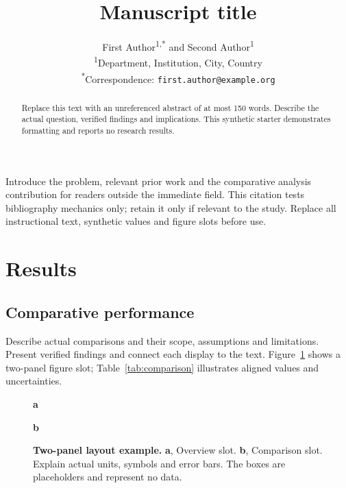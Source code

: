 \documentclass[11pt]{article}
\title{Manuscript title}
\author{First Author\textsuperscript{1,*} and Second Author\textsuperscript{1}\\
  \small \textsuperscript{1}Department, Institution, City, Country\\
  \small \textsuperscript{*}Correspondence: \texttt{first.author@example.org}}
\date{}
\begin{document}
\maketitle
\begin{abstract}
Replace this text with an unreferenced abstract of at most 150 words.
Describe the actual question, verified findings and implications. This
synthetic starter demonstrates formatting and reports no research results.
\end{abstract}

Introduce the problem, relevant prior work and the comparative analysis contribution
for readers outside the immediate field. This citation tests bibliography
mechanics only; retain it only if relevant to the study\cite{wilkinson2016fair}.
Replace all instructional text, synthetic values and figure slots before use.

\section{Results}\label{sec:results}
\subsection{Comparative performance}
Describe actual comparisons and their scope, assumptions and limitations.
Present verified findings and connect each display to the text.
Figure~\ref{fig:comparison} shows a two-panel figure slot; Table~\ref{tab:comparison}
illustrates aligned values and uncertainties.
\begin{figure}[htbp]
\centering
\begin{minipage}[t]{0.47\linewidth}
\centering\textbf{a}\par\smallskip
{}
\end{minipage}\hfill
\begin{minipage}[t]{0.47\linewidth}
\centering\textbf{b}\par\smallskip
{}
\end{minipage}
\caption{\textbf{Two-panel layout example.} \textbf{a}, Overview slot.
\textbf{b}, Comparison slot. Explain actual units, symbols and error bars.
The boxes are placeholders and represent no data.}
\label{fig:comparison}
\end{figure}
\end{document}
